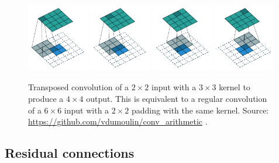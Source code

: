 \begin{figure}
    \centering
    \includegraphics[width=0.24\textwidth]{Images/Background/Convolution/no_padding_no_strides_transposed_00.pdf}
    \includegraphics[width=0.24\textwidth]{Images/Background/Convolution/no_padding_no_strides_transposed_01.pdf}
    \includegraphics[width=0.24\textwidth]{Images/Background/Convolution/no_padding_no_strides_transposed_02.pdf}
    \includegraphics[width=0.24\textwidth]{Images/Background/Convolution/no_padding_no_strides_transposed_03.pdf}
    \caption[Example of a transposed convolution]{Transposed convolution of a $2\times 2$ input with a $3\times 3$ kernel to produce a $4\times 4$ output. This is equivalent to a regular convolution of a $6\times 6$ input with a $2\times 2$ padding with the same kernel. Source: \url{https://github.com/vdumoulin/conv_arithmetic} \cite{trans-conv}.}
    \label{fig:no_padding_no_strides_transposed}
\end{figure}

\subsection{Residual connections}


